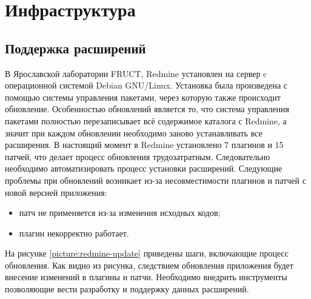 \chapter{Инфраструктура}
\section{Поддержка расширений}
В Ярославской лаборатории FRUCT, Redmine установлен на сервер c операционной
системой Debian GNU/Linux. Установка была произведена с помощью системы
управления пакетами, через которую также происходит обновление. Особенностью обновлений
является то, что система управления пакетами полностью перезаписывает всё
содержимое каталога с Redmine, а значит при каждом обновлении необходимо заново
устанавливать все расширения. В настоящий момент в Redmine установлено 7
плагинов и 15 патчей, что делает процесс обновления трудозатратным.
Следовательно необходимо автоматизировать процесс установки расширений.
Следующие проблемы при обновлений возникает из-за несовместимости плагинов и
патчей с новой версией приложения:
\begin{itemize}
  \item патч не применяется из-за изменения исходных кодов;
  \item плагин некорректно работает.
\end{itemize}
На рисунке \ref{picture:redmine-update} приведены шаги, включающие процесс
обновления. Как видно из рисунка, следствием обновления приложения будет
внесение изменений в плагины и патчи. Необходимо внедрить инструменты
позволяющие вести разработку и поддержку данных расширений.

